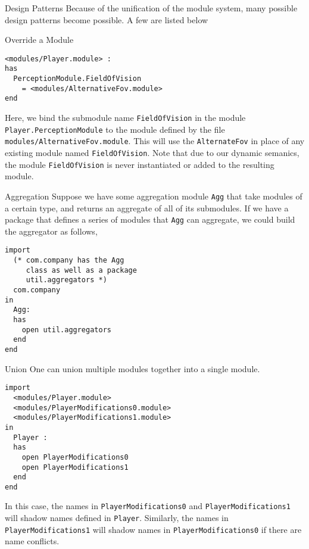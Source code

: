 \documentclass[11pt]{article}
\begin{document}
\begin{section}{Design Patterns}
Because of the unification of the module system, many possible design patterns become possible. A few are listed below
\begin{subsection}{Override a Module}
\begin{verbatim}
<modules/Player.module> : 
has
  PerceptionModule.FieldOfVision 
    = <modules/AlternativeFov.module>
end
\end{verbatim}
Here, we bind the submodule name \verb|FieldOfVision| in the module\\ \verb|Player.PerceptionModule| to the module defined by the file \\\verb|modules/AlternativeFov.module|. This will use the \verb|AlternateFov| in place of any existing module named \verb|FieldOfVision|. Note that due to our dynamic semanics, the module \verb|FieldOfVision| is never instantiated or added to the resulting module.
\end{subsection}
\begin{subsection}{Aggregation}
Suppose we have some aggregation module \verb|Agg| that take modules of a certain type, and returns an aggregate of all of its submodules. If we have a package that defines a series of modules that \verb|Agg| can aggregate, we could build the aggregator as follows,
\begin{verbatim}
import
  (* com.company has the Agg 
     class as well as a package
     util.aggregators *)
  com.company
in 
  Agg:
  has
  	open util.aggregators
  end
end
\end{verbatim}
\end{subsection}
\begin{subsection}{Union}
One can union multiple modules together into a single module. 
\begin{verbatim}
import
  <modules/Player.module>
  <modules/PlayerModifications0.module>
  <modules/PlayerModifications1.module>
in
  Player :
  has
  	open PlayerModifications0
	open PlayerModifications1
  end
end
\end{verbatim}
In this case, the names in \verb|PlayerModifications0| and \verb|PlayerModifications1| will shadow names defined in \verb|Player|. Similarly, the names in \verb|PlayerModifications1| will shadow names in \verb|PlayerModifications0| if there are name conflicts.
\end{subsection}
\end{section} 
\end{document}
